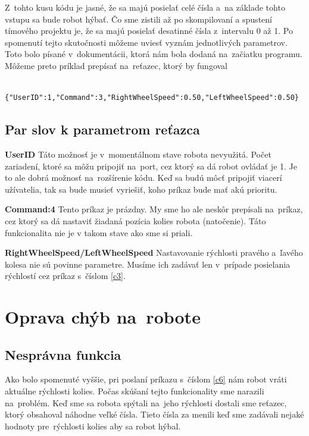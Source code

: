 \noindent Z~tohto kusu kódu je jasné, že sa majú posielať celé čísla a~na základe tohto vstupu sa bude robot hýbať. Čo sme zistili až po skompilovaní
a spustení tímového projektu je, že sa majú posielať desatinné čísla z~intervalu 0 až 1. Po spomenutí tejto skutočnosti môžeme uviesť vyznám jednotlivých parametrov.
Toto bolo písané v~dokumentácii, ktorá nám bola dodaná na~začiatku programu. Môžeme preto príklad prepísať na~reťazec, ktorý by fungoval

\label{jsonSpeedRequestGood}
\begin{lstlisting}
		{"UserID":1,"Command":3,"RightWheelSpeed":0.50,"LeftWheelSpeed":0.50}
\end{lstlisting}

\subsection{Par slov k parametrom reťazca}

\noindent \textbf{UserID} \newline
\indent Táto možnosť je v~momentálnom stave robota nevyužitá. Počet zariadení, ktoré sa môžu pripojiť na~port, cez ktorý sa dá robot ovládať je 1. Je to ale
dobrá možnosť na~rozšírenie kódu. Keď sa budú môcť pripojiť viacerí užívatelia, tak sa bude musieť vyriešiť, koho príkaz bude mať akú prioritu. \newline

\noindent \textbf{Command:4} \newline
\indent Tento príkaz je prázdny. My sme ho ale neskôr prepísali na~príkaz, cez ktorý sa dá nastaviť žiadaná pozícia kolies robota (natočenie). Táto funkcionalita nie je
v takom stave ako sme si priali. \newline

\noindent \textbf{RightWheelSpeed/LeftWheelSpeed} \newline
\noindent Nastavovanie rýchlosti pravého a~ľavého kolesa nie sú povinne parametre. Musíme ich zadávať len v~prípade posielania rýchlostí cez príkaz s~číslom \ref{c3}.

\section{Oprava chýb na~robote}

\subsection{Nesprávna funkcia}
\indent Ako bolo spomenuté vyššie, pri poslaní príkazu s~číslom \ref{c6} nám robot vráti aktuálne rýchlosti kolies. Počas skúšaní tejto funkcionality sme narazili na~problém.
Keď sme sa robota spýtali na~jeho rýchlosti dostali sme reťazec, ktorý obsahoval náhodne veľké čísla. Tieto čísla za menili keď sme zadávali nejaké hodnoty pre~rýchlosti kolies
aby sa robot hýbal.

